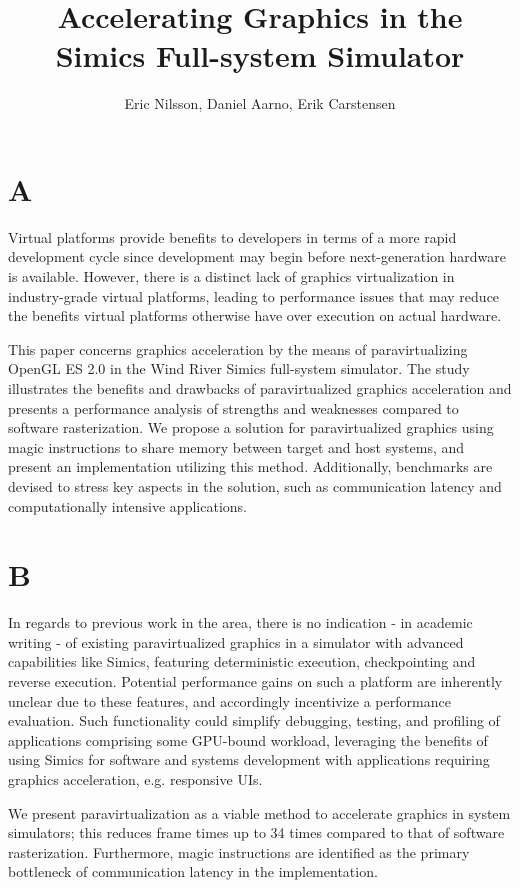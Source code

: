 \documentclass{article}
\begin{document}
\title{Accelerating Graphics in the Simics Full-system Simulator}
\author{Eric Nilsson, Daniel Aarno, Erik Carstensen}
\maketitle

\section{A}
Virtual platforms provide benefits to developers in terms of a more rapid development cycle since development may begin before next-generation hardware is available.
However, there is a distinct lack of graphics virtualization in industry-grade virtual platforms, leading to performance issues that may reduce the benefits virtual platforms otherwise have over execution on actual hardware.

This paper concerns graphics acceleration by the means of paravirtualizing OpenGL ES 2.0 in the Wind River Simics full-system simulator.
The study illustrates the benefits and drawbacks of paravirtualized graphics acceleration and presents a performance analysis of strengths and weaknesses compared to software rasterization.
We propose a solution for paravirtualized graphics using magic instructions to share memory between target and host systems, and present an implementation utilizing this method.
Additionally, benchmarks are devised to stress key aspects in the solution, such as communication latency and computationally intensive applications.

\section{B}
In regards to previous work in the area, there is no indication - in academic writing - of existing paravirtualized graphics in a simulator with advanced capabilities like Simics, featuring deterministic execution, checkpointing and reverse execution.
Potential performance gains on such a platform are inherently unclear due to these features, and accordingly incentivize a performance evaluation.
Such functionality could simplify debugging, testing, and profiling of applications comprising some GPU-bound workload, leveraging the benefits of using Simics for software and systems development with applications requiring graphics acceleration, e.g. responsive UIs.

We present paravirtualization as a viable method to accelerate graphics in system simulators; this reduces frame times up to 34 times compared to that of software rasterization.
Furthermore, magic instructions are identified as the primary bottleneck of communication latency in the implementation.
\end{document}
